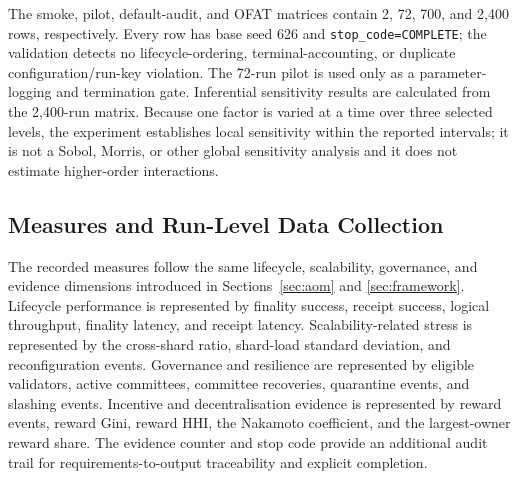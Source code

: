 \documentclass[a4paper,fleqn]{cas-sc}
\begin{document}
The smoke, pilot, default-audit, and OFAT matrices contain 2, 72, 700, and
2,400 rows, respectively. Every row has base seed 626 and
\texttt{stop\_code=COMPLETE}; the validation detects no lifecycle-ordering, terminal-accounting, or
duplicate configuration/run-key violation. The 72-run pilot is
used only as a parameter-logging and termination gate. Inferential sensitivity
results are calculated from the 2,400-run matrix. Because one factor is varied
at a time over three selected levels, the experiment establishes local
sensitivity within the reported intervals; it is not a Sobol, Morris, or other
global sensitivity analysis and it does not estimate higher-order
interactions.

\subsection{Measures and Run-Level Data Collection}
\label{subsec:metrics}

The recorded measures follow the same lifecycle, scalability, governance, and
evidence dimensions introduced in Sections~\ref{sec:aom} and
\ref{sec:framework}. Lifecycle performance is represented by finality success,
receipt success, logical throughput, finality latency, and receipt latency.
Scalability-related stress is represented by the cross-shard ratio, shard-load
standard deviation, and reconfiguration events. Governance and resilience are
represented by eligible validators, active committees, committee recoveries,
quarantine events, and slashing events. Incentive and decentralisation evidence
is represented by reward events, reward Gini, reward HHI, the Nakamoto
coefficient, and the largest-owner reward share. The evidence counter and stop
code provide an additional audit trail for requirements-to-output traceability
and explicit completion.
\end{document}
